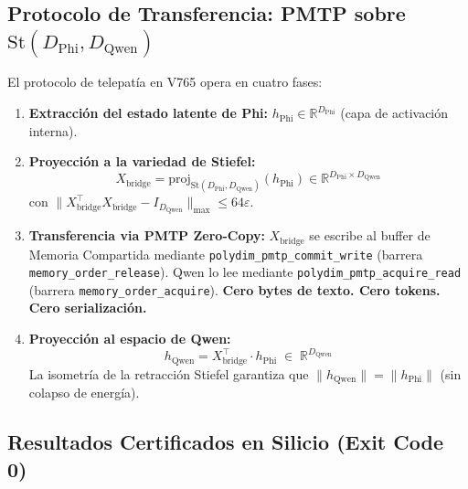 \subsection{Protocolo de Transferencia: PMTP sobre $\mathrm{St}(D_{\text{Phi}}, D_{\text{Qwen}})$}

El protocolo de telepatía en V765 opera en cuatro fases:

\begin{enumerate}
  \item \textbf{Extracción del estado latente de Phi:}
        $h_{\text{Phi}} \in \mathbb{R}^{D_{\text{Phi}}}$ (capa de activación interna).

  \item \textbf{Proyección a la variedad de Stiefel:}
        \begin{equation}
          X_{\text{bridge}} = \mathrm{proj}_{\mathrm{St}(D_{\text{Phi}}, D_{\text{Qwen}})}(h_{\text{Phi}})
          \in \mathbb{R}^{D_{\text{Phi}} \times D_{\text{Qwen}}}
        \end{equation}
        con $\|X_{\text{bridge}}^\top X_{\text{bridge}} - I_{D_{\text{Qwen}}}\|_{\max} \le 64\varepsilon$.

  \item \textbf{Transferencia via PMTP Zero-Copy:}
        $X_{\text{bridge}}$ se escribe al buffer de Memoria Compartida mediante
        \texttt{polydim\_pmtp\_commit\_write} (barrera \texttt{memory\_order\_release}).
        Qwen lo lee mediante \texttt{polydim\_pmtp\_acquire\_read}
        (barrera \texttt{memory\_order\_acquire}).
        \textbf{Cero bytes de texto. Cero tokens. Cero serialización.}

  \item \textbf{Proyección al espacio de Qwen:}
        \begin{equation}
          h_{\text{Qwen}} = X_{\text{bridge}}^\top \cdot h_{\text{Phi}}
          \;\in\; \mathbb{R}^{D_{\text{Qwen}}}
        \end{equation}
        La isometría de la retracción Stiefel garantiza que $\|h_{\text{Qwen}}\| = \|h_{\text{Phi}}\|$
        (sin colapso de energía).
\end{enumerate}

\subsection{Resultados Certificados en Silicio (Exit Code 0)}

